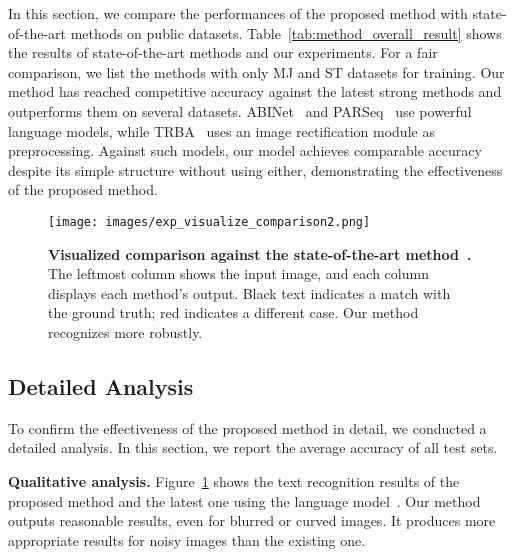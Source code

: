 \documentclass{article}
\begin{document}
In this section, we compare the performances of the proposed method with state-of-the-art methods on public datasets.
Table~\ref{tab:method_overall_result} shows the results of state-of-the-art methods and our experiments.
For a fair comparison, we list the methods with only MJ and ST datasets for training.
Our method has reached competitive accuracy against the latest strong methods and outperforms them on several datasets.
ABINet~\cite{fang2021ABINet} and PARSeq~\cite{bautista2022parseq} use powerful language models, while TRBA~\cite{baek2021TRBA} uses an image rectification module as preprocessing.
Against such models, our model achieves comparable accuracy despite its simple structure without using either, demonstrating the effectiveness of the proposed method.



\begin{figure}[htp]
	\centering
	\texttt{[image: images/exp\_visualize\_comparison2.png]}
	\caption{
\textbf{Visualized comparison against the state-of-the-art method~\cite{bautista2022parseq}.}
The leftmost column shows the input image, and each column displays each method's output.
Black text indicates a match with the ground truth; red indicates a different case.
Our method recognizes more robustly.
	}
	\label{fig:visualized_comparison}
    \vspace*{-0.30\baselineskip}
\end{figure}




\subsection{Detailed Analysis}
To confirm the effectiveness of the proposed method in detail, we conducted a detailed analysis.
In this section, we report the average accuracy of all test sets.




\noindent
\textbf{Qualitative analysis.}
Figure~\ref{fig:visualized_comparison} shows the text recognition results of the proposed method and the latest one using the language model~\cite{bautista2022parseq}.
Our method outputs reasonable results, even for blurred or curved images.
It produces more appropriate results for noisy images than the existing one.



\begin{table}[bt]
\centering
\caption{
	\textbf{Impact of character-aware head.}
}
\label{tab:ablation_characterawarehead}
\vspace*{-1.00\baselineskip}
\end{table}
\end{document}

